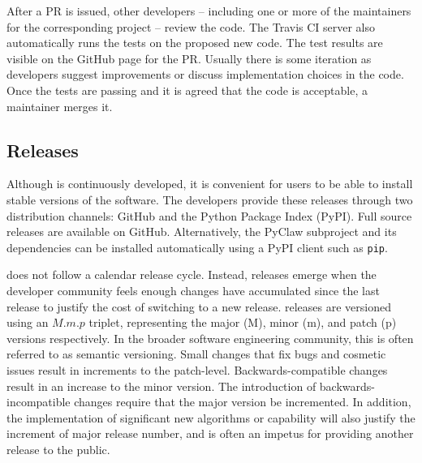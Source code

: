 After a PR is issued, other developers -- including one or more of the
maintainers for the corresponding project -- review the code.  The Travis
CI server also automatically runs the tests on the proposed new code.  The test
results are visible on the GitHub page for the PR.  Usually there is
some iteration as developers suggest improvements or discuss
implementation choices in the code.  Once the tests are passing and it
is agreed that the code is acceptable, a maintainer merges it.

\subsection{Releases}

Although \clawpack is continuously developed, it is convenient for
users to be able to install stable versions of the software.  The
\clawpack developers provide these releases through two distribution
channels: GitHub and the Python Package Index (PyPI).  Full source
releases are available on GitHub.  Alternatively, the PyClaw
subproject and its dependencies can be installed automatically using a
PyPI client such as \texttt{pip}. 

\clawpack does not follow a calendar release cycle.  Instead, releases
emerge when the developer community feels enough changes have
accumulated since the last release to justify
the cost of switching to a new release.  \clawpack releases are
versioned using an $M.m.p$ triplet, representing the major (M), minor (m), and
patch (p) versions respectively.  In the broader software engineering
community, this is often referred to as semantic versioning.  Small
changes that fix bugs and cosmetic issues result in increments to the
patch-level.  Backwards-compatible changes result in an increase to
the minor version.  The introduction of backwards-incompatible changes
require that the major version be incremented.  In addition, the
implementation of significant new algorithms or capability will also
justify the increment of major release number, and is often an impetus
for providing another release to the public.
